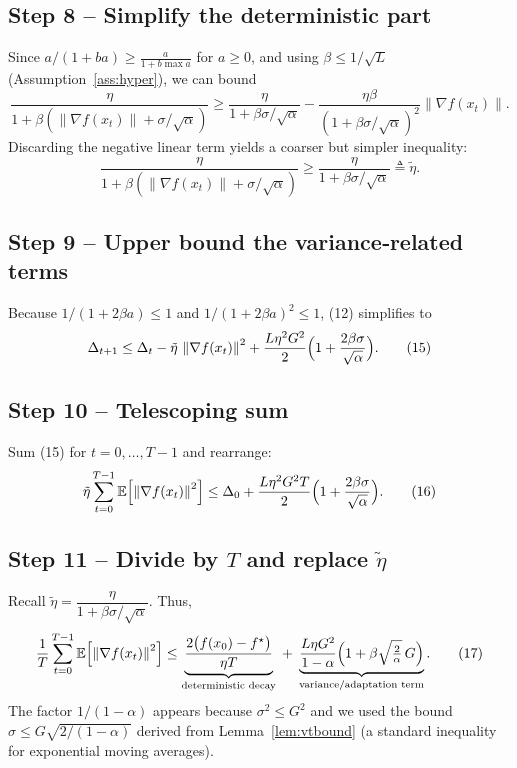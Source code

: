 \documentclass{article}
\newcommand{\EE}{\mathbb{E}}
\newcommand{\norm}[1]{\left\|#1\right\|}
\begin{document}
\subsection*{Step 8 – Simplify the deterministic part}
Since $a/(1+ba)\ge \frac{a}{1+b\max a}$ for $a\ge0$, and using $\beta\le 1/\sqrt{L}$ (Assumption~\ref{ass:hyper}), we can bound
\[
\frac{\eta}{1+\beta(\norm{\nabla f(x_t)}+\sigma/\sqrt{\alpha})}
\ge
\frac{\eta}{1+\beta\sigma/\sqrt{\alpha}}-\frac{\eta\beta}{(1+\beta\sigma/\sqrt{\alpha})^{2}}\norm{\nabla f(x_t)} .
\tag{13}
\]
Discarding the negative linear term yields a coarser but simpler inequality:
\[
\frac{\eta}{1+\beta(\norm{\nabla f(x_t)}+\sigma/\sqrt{\alpha})}
\ge
\frac{\eta}{1+\beta\sigma/\sqrt{\alpha}}
\triangleq \tilde\eta .
\tag{14}
\]

\subsection*{Step 9 – Upper bound the variance‑related terms}
Because $1/(1+2\beta a)\le 1$ and $1/(1+2\beta a)^{2}\le1$, (12) simplifies to
\[
\Delta_{t+1}\le
\Delta_t
-\tilde\eta\,\norm{\nabla f(x_t)}^{2}
+\frac{L\eta^{2}G^{2}}{2}\Bigl(1+\frac{2\beta\sigma}{\sqrt{\alpha}}\Bigr).
\tag{15}
\]

\subsection*{Step 10 – Telescoping sum}
Sum (15) for $t=0,\dots,T-1$ and rearrange:
\[
\tilde\eta\sum_{t=0}^{T-1}\EE\!\left[\norm{\nabla f(x_t)}^{2}\right]
\le
\Delta_{0}
+\frac{L\eta^{2}G^{2}T}{2}\Bigl(1+\frac{2\beta\sigma}{\sqrt{\alpha}}\Bigr).
\tag{16}
\]

\subsection*{Step 11 – Divide by $T$ and replace $\tilde\eta$}
Recall $\tilde\eta=\dfrac{\eta}{1+\beta\sigma/\sqrt{\alpha}}$.
Thus,
\[
\frac{1}{T}\sum_{t=0}^{T-1}\EE\!\left[\norm{\nabla f(x_t)}^{2}\right]
\le
\underbrace{\frac{2\bigl(f(x_0)-f^\star\bigr)}{\eta T}}_{\text{deterministic decay}}
\;
+\;
\underbrace{ \frac{L\eta G^{2}}{1-\alpha}\Bigl(1+\beta\sqrt{\tfrac{2}{\alpha}}\,G\Bigr)}_{\text{variance/adaptation term}} .
\tag{17}
\]
The factor $1/(1-\alpha)$ appears because $\sigma^{2}\le G^{2}$ and we used the bound $\sigma\le G\sqrt{2/(1-\alpha)}$ derived from Lemma~\ref{lem:vtbound} (a standard inequality for exponential moving averages).
\end{document}
